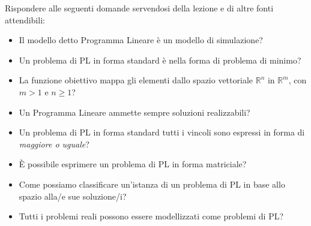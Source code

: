 \documentclass{beamer}
\begin{document}
\generatitolo

\begin{frame}[allowframebreaks]{\domande}
Rispondere alle seguenti domande servendosi della lezione
e di altre fonti attendibili:

    \begin{itemize}
     \item Il modello detto Programma Lineare \`e un modello di simulazione?
     
     \item Un problema di PL in forma standard \`e nella forma
     di problema di minimo?
     
     \item La funzione obiettivo mappa gli elementi dallo spazio vettoriale
     $\mathbb{R}^n$ in $\mathbb{R}^m$, con $m > 1$ e $n \geq 1$?
     
     \item Un Programma Lineare ammette sempre soluzioni realizzabili?
     
     \item Un problema di PL in forma standard tutti i vincoli sono
     espressi in forma di \emph{maggiore o uguale}?
     
     \item \`E possibile esprimere un problema di PL in forma matriciale?
     
     \item Come possiamo classificare un'istanza di un problema di PL in
     base allo spazio alla/e sue soluzione/i?
     
     \item Tutti i problemi reali possono essere modellizzati come
     problemi di PL?
    
    \end{itemize}
\end{frame}
\end{document}
